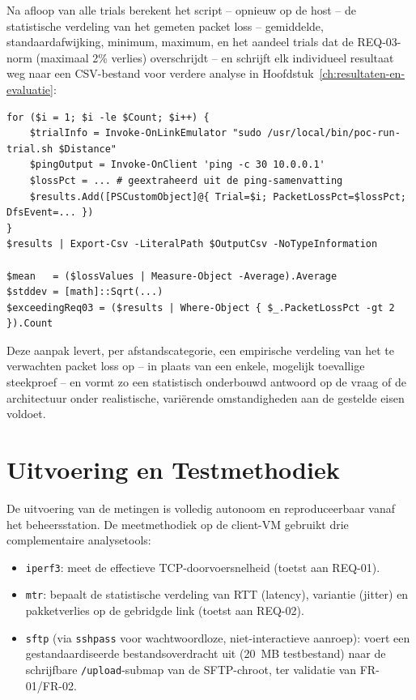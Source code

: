 Na afloop van alle trials berekent het script -- opnieuw op de host -- de statistische
verdeling van het gemeten packet loss -- gemiddelde, standaardafwijking, minimum,
maximum, en het aandeel trials dat de REQ-03-norm (maximaal 2\% verlies) overschrijdt --
en schrijft elk individueel resultaat weg naar een CSV-bestand voor verdere analyse in
Hoofdstuk~\ref{ch:resultaten-en-evaluatie}:

\begin{listing}[h]
\begin{lstlisting}[style=powershellstyle]
for ($i = 1; $i -le $Count; $i++) {
    $trialInfo = Invoke-OnLinkEmulator "sudo /usr/local/bin/poc-run-trial.sh $Distance"
    $pingOutput = Invoke-OnClient 'ping -c 30 10.0.0.1'
    $lossPct = ... # geextraheerd uit de ping-samenvatting
    $results.Add([PSCustomObject]@{ Trial=$i; PacketLossPct=$lossPct; DfsEvent=... })
}
$results | Export-Csv -LiteralPath $OutputCsv -NoTypeInformation

$mean   = ($lossValues | Measure-Object -Average).Average
$stddev = [math]::Sqrt(...)
$exceedingReq03 = ($results | Where-Object { $_.PacketLossPct -gt 2 }).Count
\end{lstlisting}
\caption[Run-DistanceTrials.ps1]{Vereenvoudigde kern van \texttt{Run-DistanceTrials.ps1}:
$N$ onafhankelijke trials, elk met een verse willekeurige realisatie, gevolgd door de
berekening van gemiddelde, standaardafwijking en het aandeel trials boven REQ-03.
Uitgevoerd op: de host, die \texttt{poc-link-emulator} (\texttt{Invoke-OnLinkEmulator})
en \texttt{poc-client} (\texttt{Invoke-OnClient}) via SSH aanstuurt.}
\label{lst:run-distance-trials}
\end{listing}

Deze aanpak levert, per afstandscategorie, een empirische verdeling van het te
verwachten packet loss op -- in plaats van een enkele, mogelijk toevallige steekproef --
en vormt zo een statistisch onderbouwd antwoord op de vraag of de architectuur onder
realistische, variërende omstandigheden aan de gestelde eisen voldoet.

\section{Uitvoering en Testmethodiek}%
\label{sec:sim-uitvoering}

De uitvoering van de metingen is volledig autonoom en reproduceerbaar vanaf het
beheersstation. De meetmethodiek op de client-VM gebruikt drie complementaire
analysetools:
\begin{itemize}
  \item \texttt{iperf3}: meet de effectieve TCP-doorvoersnelheid (toetst aan REQ-01).
  \item \texttt{mtr}: bepaalt de statistische verdeling van RTT (latency), variantie
        (jitter) en pakketverlies op de gebridgde link (toetst aan REQ-02).
  \item \texttt{sftp} (via \texttt{sshpass} voor wachtwoordloze, niet-interactieve
        aanroep): voert een gestandaardiseerde bestandsoverdracht uit (20~MB
        testbestand) naar de schrijfbare \texttt{/upload}-submap van de SFTP-chroot, ter
        validatie van FR-01/FR-02.
\end{itemize}


